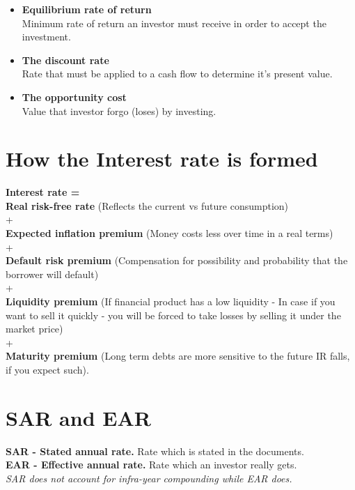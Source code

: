 \documentclass{article}
\begin{document}
\begin{itemize}
\item \textbf{Equilibrium rate of return}
\\
Minimum rate of return an investor must receive in order to accept the investment.

\item \textbf{The discount rate}
\\
Rate that must be applied to a cash flow to determine it's present value.

\item \textbf{The opportunity cost}
\\
Value that investor forgo (loses) by investing.

\end{itemize}



\section{How the Interest rate is formed}
\textbf{Interest rate =} \\
\textbf{Real risk-free rate} (Reflects the current vs future consumption)\\
+ \\
\textbf{Expected inflation premium} (Money costs less over time in a real terms)\\
+ \\
\textbf{Default risk premium} (Compensation for possibility and probability that the borrower will default) \\
+ \\
\textbf{Liquidity premium} (If financial product has a low liquidity - In case if you want to sell it quickly - you will be forced to take losses by selling it under the market price)\\
+ \\
\textbf{Maturity premium} (Long term debts are more sensitive to the future IR falls, if you expect such).

\section{SAR and EAR}
\textbf{SAR - Stated annual rate.} Rate which is stated in the documents.\\
\textbf{EAR - Effective annual rate.} Rate which an investor really gets.\\

\textit{SAR does not account for infra-year compounding while EAR does.}
\end{document}
